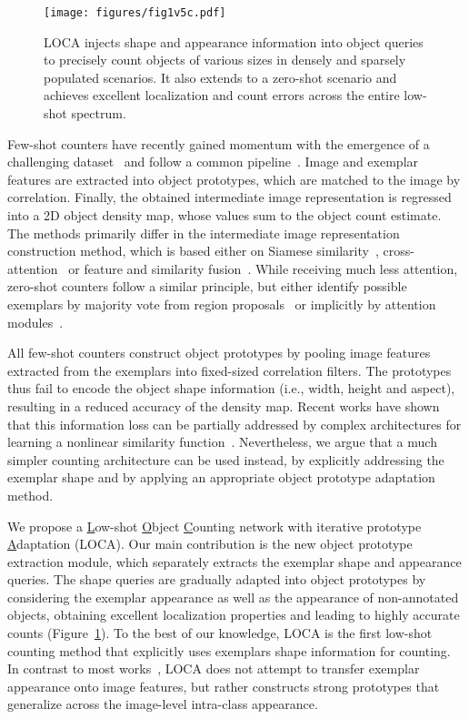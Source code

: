 \documentclass[10pt,twocolumn,letterpaper]{article}
\begin{document}
\begin{figure}[h!]
    \centering
    \texttt{[image: figures/fig1v5c.pdf]}
    \caption{ 
LOCA injects shape and appearance information into object queries to precisely count objects of various sizes in densely and sparsely populated scenarios. It also extends to a zero-shot scenario and achieves excellent localization and count errors across the entire low-shot spectrum.
    }
    \label{fig:figure1}
\end{figure}

Few-shot counters have recently gained momentum with the emergence of a challenging dataset~\cite{famnet} and follow a common pipeline~\cite{gmn,famnet,laonet,bmnet,safecount}. Image and exemplar features are extracted into object prototypes, which are matched to the image by correlation. Finally, the obtained intermediate image representation is regressed into a 2D object density map, whose values sum to the object count estimate.
The methods primarily differ in the intermediate image representation construction method, which is based either on 
Siamese similarity~\cite{gmn,famnet},
cross-attention~\cite{countr,laonet} 
or feature and similarity fusion~\cite{bmnet,safecount}.
While receiving much less attention, zero-shot counters follow a similar principle, but either identify possible exemplars by majority vote from region proposals~\cite{repprncount} or implicitly by attention modules~\cite{hobley}.

All few-shot counters construct object prototypes by pooling image features extracted from the exemplars into fixed-sized correlation filters.
The prototypes thus fail to encode the object shape information (i.e., width, height and aspect), resulting in a reduced accuracy of the density map. Recent works have shown that this information loss can be partially addressed by complex architectures for learning a nonlinear similarity function~\cite{bmnet}. Nevertheless, we argue that a much simpler counting architecture can be used instead, by explicitly addressing the exemplar shape and by applying an appropriate object prototype adaptation method. 

We propose a \underline{L}ow-shot \underline{O}bject \underline{C}ounting network with iterative prototype \underline{A}daptation (LOCA). 
Our main contribution is the new object prototype extraction module, which separately extracts the exemplar shape and appearance queries.
The shape queries are gradually adapted into object prototypes by considering the exemplar appearance as well as the appearance of non-annotated objects, obtaining excellent localization properties and leading to highly accurate counts (Figure~\ref{fig:figure1}).
To the best of our knowledge, LOCA is the first low-shot counting method that explicitly uses exemplars shape information for counting.
In contrast to most works~\cite{bmnet,famnet,cfocnet,safecount}, LOCA does not attempt to transfer exemplar appearance onto image features, but rather constructs strong prototypes that generalize across the image-level intra-class appearance. 
\end{document}
